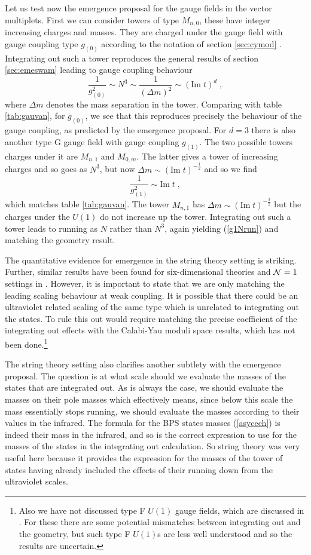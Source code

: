 \documentclass[11pt,a4paper]{article}
\numberwithin{equation}{section}
\numberwithin{table}{section}\setlength{\multlinegap}{25pt}
\newcommand{\be}{\begin{equation}}
\newcommand{\ee}{\end{equation}}
\begin{document}
{Let us test now the emergence proposal for the gauge fields in the vector multiplets. First we can consider towers of type $M_{n,0}$, these have integer increasing charges and masses. They are charged under the gauge field with gauge coupling type $g_{(0)}$ according to the notation of section \ref{sec:cymod} \cite{Grimm:2018ohb}. Integrating out such a tower reproduces the general results of section \ref{sec:emeswam} leading to gauge coupling behaviour
\be
\frac{1}{g_{(0)}^2} \sim N^3 \sim\frac{1}{\left(\Delta m\right)^2}\sim \left(\mathrm{Im\;}t \right)^{d} \;,
\ee
where $\Delta m$ denotes the mass separation in the tower. 
Comparing with table \ref{tab:gauvan}, for $g_{(0)}$, we see that this reproduces precisely the behaviour of the gauge coupling, as predicted by the emergence proposal. For $d=3$ there is also another type G gauge field with gauge coupling $g_{(1)}$. The two possible towers charges under it are $M_{n,1}$ and $M_{0,m}$. The latter gives a tower of increasing charges and so goes as $N^3$, but now $\Delta m \sim \left(\mathrm{Im\;}t \right)^{-\frac12}$ and so we find
\be
\frac{1}{g_{(1)}^2} \sim \mathrm{Im\;}t  \;,
\label{g1Nrun}
\ee
which matches table  \ref{tab:gauvan}. The tower $M_{n,1}$ has $\Delta m \sim \left(\mathrm{Im\;}t \right)^{-\frac32}$ but the charges under the $U(1)$ do not increase up the tower. Integrating out such a tower leads to running as $N$ rather than $N^3$, again yielding (\ref{g1Nrun}) and matching the geometry result. 

The quantitative evidence for emergence in the string theory setting is striking. Further, similar results have been found for six-dimensional theories and ${\cal N}=1$ settings in \cite{Lee:2018urn,Lee:2018spm,Lee:2019tst}. However, it is important to state that we are only matching the leading scaling behaviour at weak coupling. It is possible that there could be an ultraviolet related scaling of the same type which is unrelated to integrating out the states. To rule this out would require matching the precise coefficient of the integrating out effects with the Calabi-Yau moduli space results, which has not been done.\footnote{Also we have not discussed type F $U(1)$ gauge fields, which are discussed in \cite{Grimm:2018ohb}. For these there are some potential mismatches between integrating out and the geometry, but such type F $U(1)$s are less well understood and so the results are uncertain.}

The string theory setting also clarifies another subtlety with the emergence proposal. The question is at what scale should we evaluate the masses of the states that are integrated out. As is always the case, we should evaluate the masses on their pole masses which effectively means, since below this scale the mass essentially stops running, we should evaluate the masses according to their values in the infrared. The formula for the BPS states masses (\ref{asycech}) is indeed their mass in the infrared, and so is the correct expression to use for the masses of the states in the integrating out calculation. So string theory was very useful here because it provides the expression for the masses of the tower of states having already included the effects of their running down from the ultraviolet scales. 

}
\end{document}
